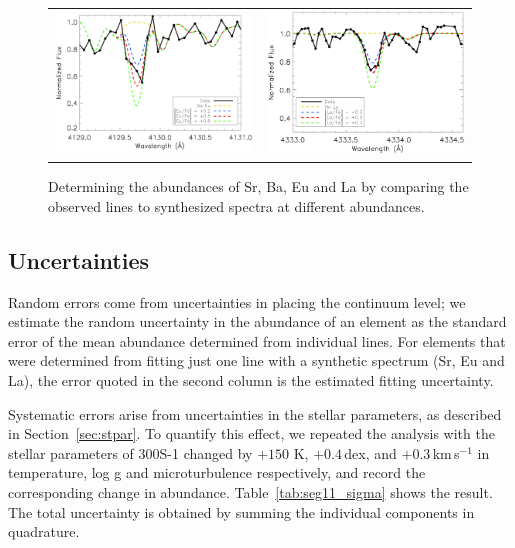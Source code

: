\documentclass{emulateapj}
\begin{document}
\begin{figure}
\begin{center}
\begin{tabular}{cc}
  \includegraphics[width=8.5cm,clip=true,bbllx=80, bblly=362,bburx=558, bbury=705]{eu4129_synth.ps} &  
  \includegraphics[width=8.5cm,clip=true,bbllx=80, bblly=362,bburx=550, bbury=705]{la4333_synth.ps} \\
  \end{tabular}
  \caption{Determining the abundances of Sr, Ba, Eu and La by
    comparing the observed lines to synthesized spectra at different
    abundances. }
  \label{fig:nc_syn}
 \end{center}
\end{figure}




\subsection{Uncertainties}
\label{sec:unc}
Random errors come from uncertainties in placing the continuum level;
we estimate the random uncertainty in the abundance of an element as
the standard error of the mean abundance determined from individual
lines. For elements that were determined from fitting just one line
with a synthetic spectrum (Sr, Eu and La), the error quoted in the
second column is the estimated fitting uncertainty.

Systematic errors arise from uncertainties in the stellar parameters,
as described in Section~\ref{sec:stpar}. To quantify this effect, we
repeated the analysis with the stellar parameters of 300S-1 changed by
$+150$ K, $+0.4$\,dex, and $+0.3$\,km\,s$^{-1}$ in temperature, log g
and microturbulence respectively, and record the corresponding change
in abundance. Table~\ref{tab:seg11_sigma} shows the result. The total
uncertainty is obtained by summing the individual components in
quadrature.
\end{document}
